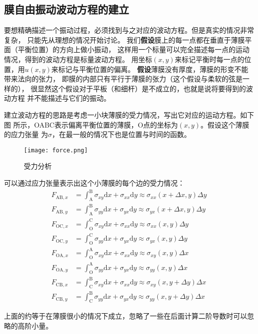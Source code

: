 \documentclass[a4paper]{ctexart}
\def\d{\mathrm{d}}
\newcommand{\mr}[1]{\mathrm{#1}}
\begin{document}
	\subsection{膜自由振动波动方程的建立}
	要想精确描述一个振动过程，必须找到与之对应的波动方程。但是真实的情况非常复杂，
	只能先从理想的情况开始讨论。
	我们\textbf{假设}膜上的每一点都在垂直于薄膜平面（平衡位置）的方向上做小振动，
	这样用一个标量可以完全描述每一点的运动情况，得到的波动方程是标量波动方程。
	用坐标$(x, y)$来标记平衡时每一点的位置，用$u(x, y)$来标记与平衡位置的偏离。
	\textbf{假设}薄膜没有厚度，薄膜的形变不能带来法向的张力，
	即膜的内部只有平行于薄膜的张力（这个假设与柔软的弦是一样的），
	很显然这个假设对于平板（和细杆）是不成立的，也就是说将要得到的波动方程
	并不能描述与它们的振动。
	\par 建立波动方程的思路是考虑一小块薄膜的受力情况，写出它对应的运动方程。如下图
	所示，OABC表示偏离平衡位置的薄膜，O点的坐标为$(x, y)$。假设这个薄膜的应力张量
	为$\sigma$，在最一般的情况下也是位置与时间的函数。
	\begin{figure}[htbp]
		\centering
		\texttt{[image: force.png]}
		\caption{受力分析}
	\end{figure} 
	可以通过应力张量表示出这个小薄膜的每个边的受力情况：
	\begin{align}
		F_{\mr{AB}, x} &= \int_{\mr{A}}^{\mr{B}} \sigma_{xy}\d x + \sigma_{xx}\d y \approx \sigma_{xx}(x+\Delta x, y)\Delta y\\
		F_{\mr{AB}, y} &= \int_{\mr{A}}^{\mr{B}} \sigma_{yy}\d x + \sigma_{yx}\d y \approx \sigma_{yx}(x+\Delta x, y)\Delta y\\
		F_{\mr{OC}, x} &= \int_{\mr{O}}^{\mr{C}} \sigma_{xy}\d x + \sigma_{xx}\d y \approx \sigma_{xx}(x, y)\Delta y\\
		F_{\mr{OC}, y} &= \int_{\mr{O}}^{\mr{C}} \sigma_{yy}\d x + \sigma_{yx}\d y \approx \sigma_{yx}(x, y)\Delta y\\
		F_{\mr{OA}, x} &= \int_{\mr{O}}^{\mr{A}} \sigma_{xy}\d x + \sigma_{xx}\d y \approx \sigma_{xy}(x, y)\Delta x\\
		F_{\mr{OA}, y} &= \int_{\mr{O}}^{\mr{A}} \sigma_{yy}\d x + \sigma_{yx}\d y \approx \sigma_{yy}(x, y)\Delta x\\
		F_{\mr{CB}, x} &= \int_{\mr{C}}^{\mr{B}} \sigma_{xy}\d x + \sigma_{xx}\d y \approx \sigma_{xy}(x, y + \Delta y)\Delta x\\
		F_{\mr{CB}, y} &= \int_{\mr{C}}^{\mr{B}} \sigma_{yy}\d x + \sigma_{yx}\d y \approx \sigma_{yy}(x, y + \Delta y)\Delta x
	\end{align}
	\par 上面的约等于在薄膜很小的情况下成立，忽略了一些在后面计算二阶导数时可以忽略的高阶小量。
\end{document}
